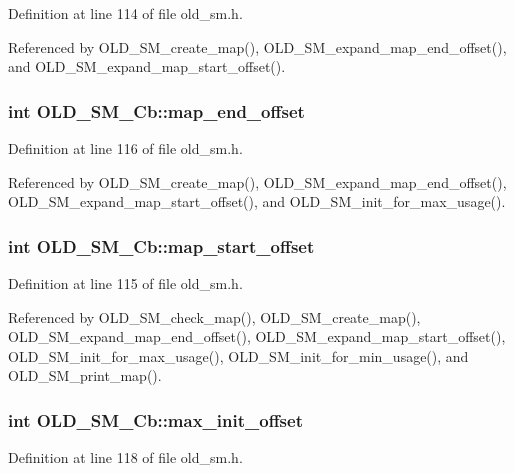 Definition at line 114 of file old\_\-sm.h.

Referenced by OLD\_\-SM\_\-create\_\-map(), OLD\_\-SM\_\-expand\_\-map\_\-end\_\-offset(), and OLD\_\-SM\_\-expand\_\-map\_\-start\_\-offset().
\subsubsection{\setlength{\rightskip}{0pt plus 5cm}int \bf{OLD\_\-SM\_\-Cb::map\_\-end\_\-offset}}\label{structOLD__SM__Cb_e95b5ff6153e6c655d0db197111983fe}




Definition at line 116 of file old\_\-sm.h.

Referenced by OLD\_\-SM\_\-create\_\-map(), OLD\_\-SM\_\-expand\_\-map\_\-end\_\-offset(), OLD\_\-SM\_\-expand\_\-map\_\-start\_\-offset(), and OLD\_\-SM\_\-init\_\-for\_\-max\_\-usage().
\subsubsection{\setlength{\rightskip}{0pt plus 5cm}int \bf{OLD\_\-SM\_\-Cb::map\_\-start\_\-offset}}\label{structOLD__SM__Cb_5df68efd9eefbc24de1747063fc1acde}




Definition at line 115 of file old\_\-sm.h.

Referenced by OLD\_\-SM\_\-check\_\-map(), OLD\_\-SM\_\-create\_\-map(), OLD\_\-SM\_\-expand\_\-map\_\-end\_\-offset(), OLD\_\-SM\_\-expand\_\-map\_\-start\_\-offset(), OLD\_\-SM\_\-init\_\-for\_\-max\_\-usage(), OLD\_\-SM\_\-init\_\-for\_\-min\_\-usage(), and OLD\_\-SM\_\-print\_\-map().
\subsubsection{\setlength{\rightskip}{0pt plus 5cm}int \bf{OLD\_\-SM\_\-Cb::max\_\-init\_\-offset}}\label{structOLD__SM__Cb_5287f4698f85b4e1fefad5c376ed42d1}




Definition at line 118 of file old\_\-sm.h.

